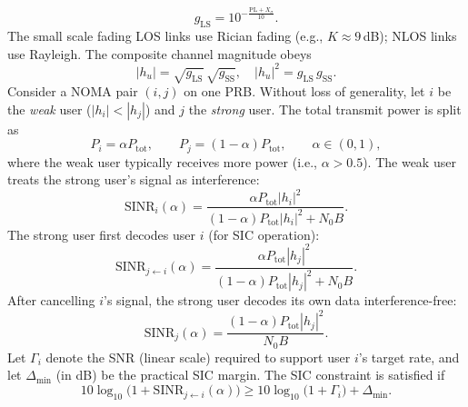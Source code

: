 \documentclass[conference]{IEEEtran}
\begin{document}
\begin{equation}
g_{\mathrm{LS}} = 10^{-\frac{\mathrm{PL} + X_{\sigma}}{10}}.
\end{equation}
The small scale fading LOS links use Rician fading (e.g., $K\!\approx\!9$\,dB); NLOS links use Rayleigh. The composite channel magnitude obeys
\begin{equation}
|h_u| = \sqrt{g_{\mathrm{LS}}}\,\sqrt{g_{\mathrm{SS}}}, \quad |h_u|^2 = g_{\mathrm{LS}}\,g_{\mathrm{SS}}.
\end{equation}
Consider a NOMA pair $(i,j)$ on one PRB. Without loss of generality, let $i$ be the \emph{weak} user ($|h_i| < |h_j|$) and $j$ the \emph{strong} user. The total transmit power is split as
\begin{equation}
P_i = \alpha P_{\mathrm{tot}}, \qquad 
P_j = (1 - \alpha) P_{\mathrm{tot}}, \qquad 
\alpha \in (0,1),
\end{equation}
where the weak user typically receives more power (i.e., $\alpha > 0.5$).
The weak user treats the strong user’s signal as interference:
\begin{equation}
\mathrm{SINR}_i(\alpha) = 
\frac{\alpha P_{\mathrm{tot}} |h_i|^2}
{(1 - \alpha) P_{\mathrm{tot}} |h_i|^2 + N_0 B}.
\end{equation}
The strong user first decodes user $i$ (for SIC operation):
\begin{equation}
\mathrm{SINR}_{j \leftarrow i}(\alpha) =
\frac{\alpha P_{\mathrm{tot}} |h_j|^2}
{(1 - \alpha) P_{\mathrm{tot}} |h_j|^2 + N_0 B}.
\end{equation}
After cancelling $i$’s signal, the strong user decodes its own data interference-free:
\begin{equation}
\mathrm{SINR}_j(\alpha) =
\frac{(1 - \alpha) P_{\mathrm{tot}} |h_j|^2}{N_0 B}.
\end{equation}
Let $\Gamma_i$ denote the SNR (linear scale) required to support user $i$’s target rate, and let $\Delta_{\min}$ (in dB) be the practical SIC margin. The SIC constraint is satisfied if
\begin{equation}
10 \log_{10}\!\big(1 + \mathrm{SINR}_{j \leftarrow i}(\alpha)\big)
\ge
10 \log_{10}\!\big(1 + \Gamma_i\big) + \Delta_{\min}.
\end{equation}
\end{document}
